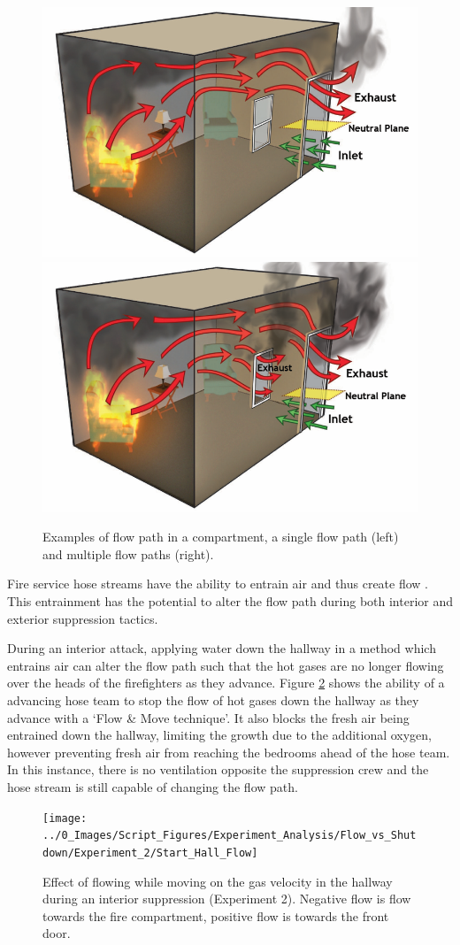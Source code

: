 \documentclass[12pt,oneside]{book}
\begin{document}
\begin{figure}[H]
\centering
\includegraphics[width=.48\textwidth]{../0_Images/Tactical_Considerations/Flow_Path_Effect/flow_path.png}
\includegraphics[width=.48\textwidth]{../0_Images/Tactical_Considerations/Flow_Path_Effect/two_flow_path.png}
\caption[Flow Path]{Examples of flow path in a compartment, a single flow path (left) and multiple flow paths (right).}
\label{fig:flow_path_effect_TC_flow_path}
\end{figure}

Fire service hose streams have the ability to entrain air and thus create flow \cite{Weinchenk_airentrainment}. This entrainment has the potential to alter the flow path during both interior and exterior suppression tactics. 

During an interior attack, applying water down the hallway in a method which entrains air can alter the flow path such that the hot gases are no longer flowing over the heads of the firefighters as they advance. Figure \ref{fig:flow_path_effect_TC_hallwayflow} shows the ability of a advancing hose team to stop the flow of hot gases down the hallway as they advance with a `Flow \& Move technique'. It also blocks the fresh air being entrained down the hallway, limiting the growth due to the additional oxygen, however preventing fresh air from reaching the bedrooms ahead of the hose team. In this instance, there is no ventilation opposite the suppression crew and the hose stream is still capable of changing the flow path.

\begin{figure}[H]
\centering
\texttt{[image: ../0\_Images/Script\_Figures/Experiment\_Analysis/Flow\_vs\_Shutdown/Experiment\_2/Start\_Hall\_Flow]}
\caption[Hallway Flow - Flow \& Move Interior Attack]{Effect of flowing while moving on the gas velocity in the hallway during an interior suppression (Experiment 2). Negative flow is flow towards the fire compartment, positive flow is towards the front door.}
\label{fig:flow_path_effect_TC_hallwayflow}
\end{figure}
\end{document}
